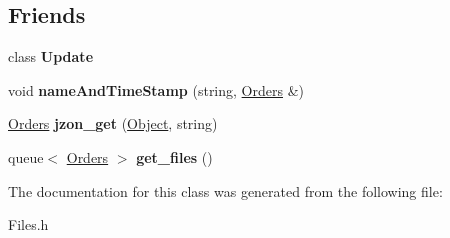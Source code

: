 \subsection*{Friends}
\begin{DoxyCompactItemize}
\item 
\hypertarget{class_orders_a2cedee6ab0da841755431efd84ad466b}{class {\bfseries Update}}\label{class_orders_a2cedee6ab0da841755431efd84ad466b}

\item 
\hypertarget{class_orders_a7d948f67d6567290a086da4d251348e6}{void {\bfseries name\-And\-Time\-Stamp} (string, \hyperlink{class_orders}{Orders} \&)}\label{class_orders_a7d948f67d6567290a086da4d251348e6}

\item 
\hypertarget{class_orders_a0f5c5536c83e028fc92b96d122a4a091}{\hyperlink{class_orders}{Orders} {\bfseries jzon\-\_\-get} (\hyperlink{class_jzon_1_1_object}{Object}, string)}\label{class_orders_a0f5c5536c83e028fc92b96d122a4a091}

\item 
\hypertarget{class_orders_a6c4e48d52301cb2e2ee86c2814a4108e}{queue$<$ \hyperlink{class_orders}{Orders} $>$ {\bfseries get\-\_\-files} ()}\label{class_orders_a6c4e48d52301cb2e2ee86c2814a4108e}

\end{DoxyCompactItemize}


The documentation for this class was generated from the following file\-:\begin{DoxyCompactItemize}
\item 
Files.\-h\end{DoxyCompactItemize}
